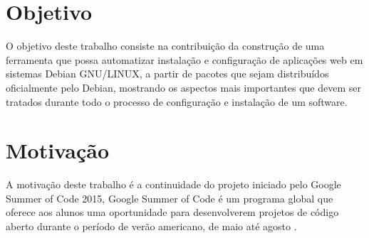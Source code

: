\section{Objetivo}

O objetivo deste trabalho consiste na contribuição da construção de uma ferramenta
que possa automatizar instalação e configuração de aplicações web em sistemas
Debian GNU/LINUX, a partir de pacotes que sejam distribuídos oficialmente pelo
Debian, mostrando os aspectos mais importantes que devem ser tratados durante
todo o processo de configuração e instalação de um software.

%


\section{Motivação}

A motivação deste trabalho é a continuidade do projeto iniciado pelo Google Summer
of Code 2015, Google Summer of Code é um programa global que oferece aos
alunos uma oportunidade para desenvolverem projetos de código aberto durante o período
de verão americano, de maio até agosto \cite{gsoc2015}.

